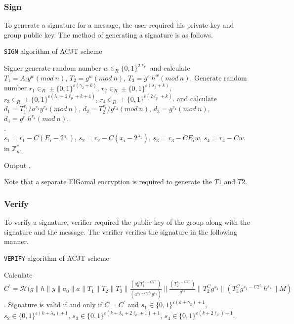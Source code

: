 \subsubsection{Sign}
To generate a signature for a message, the user required his private key and group public key. The method of generating a signature is as follows.
\begin{algorithm}
\caption{\texttt{SIGN} algorithm of ACJT scheme}
\begin{algorithmic}[1]
\STATE Signer generate random number $w \in_R \{ 0,1 \}^{2\ell_P}$ and calculate 
$T_1 = A_i y^w (mod~n)$,
$T_2 = g^w (mod~n)$,
$T_3 = g^{e_i}h^w(mod~n)$.
\STATE Generate random number
$r_1 \in_R \pm \{ 0,1 \}^{\varepsilon(\gamma_2 + k)}$, 
$r_2 \in_R \pm \{ 0,1 \}^{\varepsilon(\lambda_2 + k)}$, 
$r_3 \in_R \pm \{ 0,1 \}^{\varepsilon(\lambda_1 + 2\ell_p + k + 1)}$,
$r_4 \in_R \pm \{ 0,1 \}^{\varepsilon(2\ell_p + k)}$.
and calculate
$d_1 = T_1^{r_1} / a^{r_2}y^{r_3} (mod~n)$,
$d_2 = T_2^{r_1} / g^{r_3} (mod~n)$,
$d_3 = g^{r_4} (mod~n)$,
$d_4 = g^{r_1}h^{r_4}(mod~n)$.\\

.\\

$s_1 = r_1 - C(E_i- 2^{\gamma_1})$,
$s_2 = r_2 - C(x_i- 2^{\lambda_1})$,
$s_3 = r_3 - C E_i w$,
$s_4 = r_4 - C w$. in $\mathbb{Z}_n^*.$

\STATE Output .
\end{algorithmic}
\end{algorithm}

Note that a separate ElGamal encryption\cite{elgamal1985public} is required to generate the $T1$ and $T2$.

\subsubsection{Verify}
To verify a signature, verifier required the public key of the group along with the signature and the message. The verifier verifies the signature in the following manner.
\begin{algorithm}
\caption{\texttt{VERIFY} algorithm of ACJT scheme}
\begin{algorithmic}[1]
\STATE Calculate $C^\prime = \mathcal{H}(g\parallel h\parallel y\parallel a_0\parallel a\parallel T_1\parallel T_2\parallel T_3\parallel
\frac{(a_0^C T_1^{s_1-C2^{\gamma_1}})} {(a^{s_2-C2^{\lambda_1}}y^{s_3})}
\parallel \frac{(T_2^{s_1- C2^{\gamma_1}})}{g^{s_3}}
\parallel T_2^C g^{s_4}
\parallel (T_3^C g^{s_1-C2^{\gamma_1}} h^{s_4}
\parallel M) $.
\STATE Signature is valid if and only if $C = C^\prime$ and 
$s_1 \in \{ 0, 1\}^{\varepsilon(k + \gamma_2)+1}$,
$s_2 \in \{ 0, 1\}^{\varepsilon(k + \lambda_2)+1}$,
$s_3 \in \{ 0, 1\}^{\varepsilon(k + \lambda_1+2\ell_p + 1)+1}$,
$s_4 \in \{ 0, 1\}^{\varepsilon(k + 2\ell_p) + 1}$.
\end{algorithmic}
\end{algorithm}

